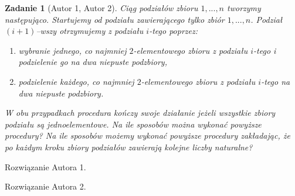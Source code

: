 \documentclass{mwart}
\newtheorem{zad}{Zadanie}[section]
\begin{document}
\begin{zad}[Autor 1, Autor 2]
    Ciąg podziałów zbioru ${1, ..., n}$ tworzymy następująco. Startujemy
    od podziału zawierającego tylko zbiór ${1, ..., n}$. Podział $(i + 1)$--wszy
    otrzymujemy z podziału $i$-tego poprzez:
    \begin{enumerate}
        \item wybranie jednego, co najmniej $2$-elementowego zbioru z podziału $i$-tego i podzielenie
              go na dwa niepuste podzbiory,
        \item podzielenie każdego, co najmniej $2$-elementowego zbioru z podziału $i$-tego na dwa
              niepuste podzbiory.
    \end{enumerate}
    W obu przypadkach procedura kończy swoje działanie jeżeli wszystkie zbiory podziału są
    jednoelementowe. Na ile sposobów można wykonać powyższe procedury? Na ile sposobów
    możemy wykonać powyższe procedury zakładając, że po każdym kroku zbiory podziałów
    zawierają kolejne liczby naturalne?
\end{zad}
\begin{mdframed}
    Rozwiązanie Autora 1.
\end{mdframed}
\begin{mdframed}
    Rozwiązanie Autora 2.
\end{mdframed}

%
%
\end{document}
